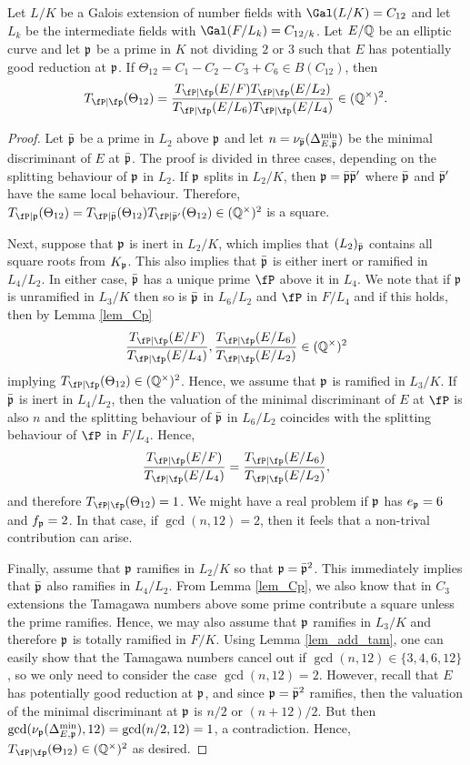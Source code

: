\begin{lemma}
    Let $L/K$ be a Galois extension of number fields with $\Gal(L/K)=C_{12}$ and let $L_k$ be the intermediate fields with $\Gal(F/L_k)=C_{12/k}$. Let $E/\mathbb{Q}$ be an elliptic curve and let $\mathfrak{p}$ be a prime in $K$ not dividing $2$ or $3$ such that $E$ has potentially good reduction at $\mathfrak{p}$. If $\Theta_{12}=C_1-C_2-C_3+C_6\in B(C_{12})$, then $$\Tp(\Theta_{12})=\frac{\Tp(E/F)\Tp(E/L_2)}{\Tp(E/L_6)\Tp(E/L_4)}\in\QQss.$$
\end{lemma}
\begin{proof}
    Let $\bar{\mathfrak{p}}$ be a prime in $L_2$ above $\mathfrak{p}$ and let $n=\nu_{\bar{\mathfrak{p}}}(\Delta_{E,\bar{\mathfrak{p}}}^{\min})$ be the minimal discriminant of $E$ at $\bar{\mathfrak{p}}$. The proof is divided in three cases, depending on the splitting behaviour of $\mathfrak{p}$ in $L_2$. If $\mathfrak{p}$ splits in $L_2/K$, then $\mathfrak{p}=\bar{\mathfrak{p}}\bar{\mathfrak{p}}'$ where $\bar{\mathfrak{p}}$ and $\bar{\mathfrak{p}}'$ have the same local behaviour. Therefore, $T_{\fP\mid\pp}(\Theta_{12})=T_{\fP\mid\bar\pp}(\Theta_{12})T_{\fP\mid\bar\pp'}(\Theta_{12})\in\QQss$ is a square. 
    
    Next, suppose that $\mathfrak{p}$ is inert in $L_2/K$, which implies that $(L_2)_{\bar{\mathfrak{p}}}$ contains all square roots from $K_{\mathfrak{p}}$. This also implies that $\bar{\mathfrak{p}}$ is either inert or ramified in $L_4/L_2$. In either case, $\bar{\mathfrak{p}}$ has a unique prime $\fP$ above it in $L_4$. We note that if $\mathfrak{p}$ is unramified in $L_3/K$ then so is $\bar{\mathfrak{p}}$ in $L_6/L_2$ and $\fP$ in $F/L_4$ and if this holds, then by Lemma \ref{lem_Cp}
    $$\frac{\Tp(E/F)}{\Tp(E/L_4)},\frac{\Tp(E/L_6)}{\Tp(E/L_2)}\in\QQss$$
    implying $\Tp(\Theta_{12})\in\QQss$. Hence, we assume that $\mathfrak{p}$ is ramified in $L_3/K$. If $\bar{\mathfrak{p}}$ is inert in $L_4/L_2$, then the valuation of the minimal discriminant of $E$ at $\fP$ is also $n$ and the splitting behaviour of $\bar{\mathfrak{p}}$ in $L_6/L_2$ coincides with the splitting behaviour of $\fP$ in $F/L_4$. Hence, 
    $$\frac{\Tp(E/F)}{\Tp(E/L_4)}=\frac{\Tp(E/L_6)}{\Tp(E/L_2)},$$
    and therefore $\Tp(\Theta_{12})=1$. {\color{red} We might have a real problem if $\mathfrak{p}$ has $e_{\mathfrak{p}}=6$ and $f_{\mathfrak{p}}=2$. In that case, if $\gcd(n,12)=2$, then it feels that a non-trival contribution can arise.}

    Finally, assume that $\mathfrak{p}$ ramifies in $L_2/K$ so that $\mathfrak{p}=\bar{\mathfrak{p}}^2$. This immediately implies that $\bar{\mathfrak{p}}$ also ramifies in $L_4/L_2$. From Lemma \ref{lem_Cp}, we also know that in $C_3$ extensions the Tamagawa numbers above some prime contribute a square unless the prime ramifies. Hence, we may also assume that $\mathfrak{p}$ ramifies in $L_3/K$ and therefore $\mathfrak{p}$ is totally ramified in $F/K$. Using Lemma \ref{lem_add_tam}, one can easily show that the Tamagawa numbers cancel out if $\gcd(n,12)\in\{3,4,6,12\}$, so we only need to consider the case $\gcd(n,12)=2$. However, recall that $E$ has potentially good reduction at $\mathfrak{p}$, and since $\mathfrak{p}=\bar{\mathfrak{p}}^2$ ramifies, then the valuation of the minimal discriminant at $\mathfrak{p}$ is $n/2$ or $(n+12)/2$. But then $\gcd(\nu_{\mathfrak{p}}(\Delta_{E,\mathfrak{p}}^{\min}),12)=\gcd(n/2,12)=1$, a contradiction. Hence, $\Tp(\Theta_{12})\in\QQss$ as desired.
\end{proof}

